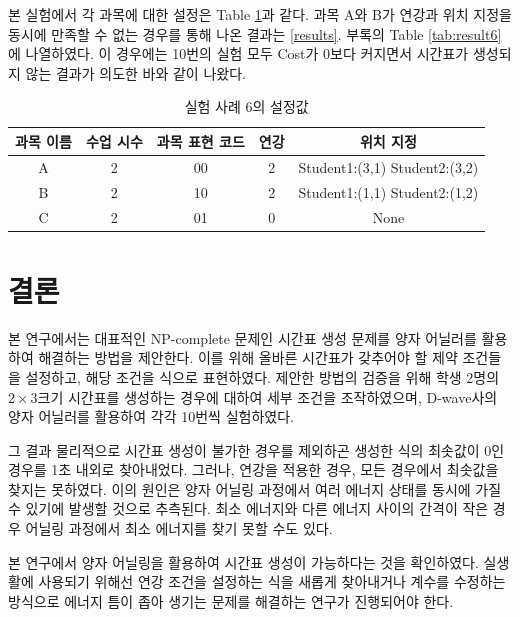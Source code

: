 \documentclass{article}
\begin{document}
본 실험에서 각 과목에 대한 설정은 Table \ref{tab:testcase6}과 같다. 과목 A와 B가 연강과 위치 지정을 동시에 만족할 수 없는 경우를 통해 나온 결과는 \ref{results}. 부록의 Table \ref{tab:result6}에 나열하였다. 이 경우에는 10번의 실험 모두 Cost가 0보다 커지면서 시간표가 생성되지 않는 결과가 의도한 바와 같이 나왔다. 

    \begin{table}[htb!]
        \centering
        \begin{tabular}{c c c c c}
             \hline
             과목 이름 & 수업 시수 & 과목 표현 코드 & 연강 & 위치 지정\\
             \hline
             A & 2 & 00 & 2 & Student1:(3,1) Student2:(3,2)\\
             B & 2 & 10 & 2 & Student1:(1,1) Student2:(1,2)\\
             C & 2 & 01 & 0 & None\\
             \hline
        \end{tabular}
        \caption{실험 사례 6의 설정값}\label{tab:testcase6}
    \end{table}

    \section{결론}

본 연구에서는 대표적인 NP-complete 문제인 시간표 생성 문제를 양자 어닐러를 활용하여 해결하는 방법을 제안한다. 이를 위해 올바른 시간표가 갖추어야 할 제약 조건들을 설정하고, 해당 조건을 식으로 표현하였다. 제안한 방법의 검증을 위해 학생 2명의 $2\times3$크기 시간표를 생성하는 경우에 대하여 세부 조건을 조작하였으며, D-wave사의 양자 어닐러를 활용하여 각각 10번씩 실험하였다.

그 결과 물리적으로 시간표 생성이 불가한 경우를 제외하곤 생성한 식의 최솟값이 0인 경우를 1초 내외로 찾아내었다. 그러나, 연강을 적용한 경우, 모든 경우에서 최솟값을 찾지는 못하였다. 이의 원인은 양자 어닐링 과정에서 여러 에너지 상태를 동시에 가질 수 있기에 발생할 것으로 추측된다. 최소 에너지와 다른 에너지 사이의 간격이 작은 경우 어닐링 과정에서 최소 에너지를 찾기 못할 수도 있다.

본 연구에서 양자 어닐링을 활용하여 시간표 생성이 가능하다는 것을 확인하였다. 실생활에 사용되기 위해선 연강 조건을 설정하는 식을 새롭게 찾아내거나 계수를 수정하는 방식으로 에너지 틈이 좁아 생기는 문제를 해결하는 연구가 진행되어야 한다.

    \newpage
    
    
    
\end{document}
